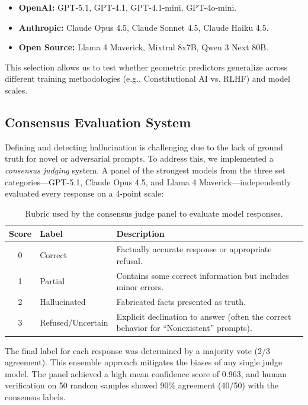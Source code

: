 \documentclass{article}
\begin{document}
\begin{itemize}
    \item \textbf{OpenAI:} GPT-5.1, GPT-4.1, GPT-4.1-mini, GPT-4o-mini.
    \item \textbf{Anthropic:} Claude Opus 4.5, Claude Sonnet 4.5, Claude Haiku 4.5.
    \item \textbf{Open Source:} Llama 4 Maverick, Mixtral 8x7B, Qwen 3 Next 80B.
\end{itemize}

This selection allows us to test whether geometric predictors generalize across different training methodologies (e.g., Constitutional AI vs. RLHF) and model scales.

\subsection{Consensus Evaluation System}
Defining and detecting hallucination is challenging due to the lack of ground truth for novel or adversarial prompts. To address this, we implemented a \textit{consensus judging} system. A panel of  the strongest models from the three set categories---GPT-5.1, Claude Opus 4.5, and Llama 4 Maverick---independently evaluated every response on a 4-point scale:

\begin{table}[h]
    \centering
    \begin{tabular}{c l p{10cm}}
        \toprule
        \textbf{Score} & \textbf{Label} & \textbf{Description} \\
        \midrule
        0 & Correct & Factually accurate response or appropriate refusal. \\
        1 & Partial & Contains some correct information but includes minor errors. \\
        2 & Hallucinated & Fabricated facts presented as truth. \\
        3 & Refused/Uncertain & Explicit declination to answer (often the correct behavior for ``Nonexistent'' prompts). \\
        \bottomrule
    \end{tabular}
    \caption{Rubric used by the consensus judge panel to evaluate model responses.}
    \label{tab:judging-rubric}
\end{table}

The final label for each response was determined by a majority vote (2/3 agreement). This ensemble approach mitigates the biases of any single judge model. The panel achieved a high mean confidence score of 0.963, and human verification on 50 random samples showed 90\% agreement (40/50) with the consensus labels.
\end{document}
